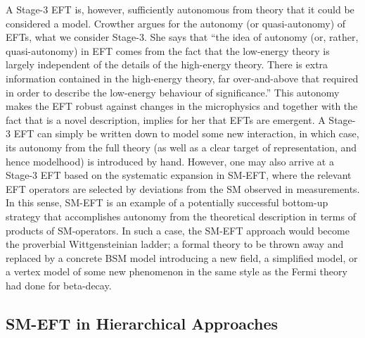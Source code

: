 A Stage-3 EFT is, however, sufficiently autonomous from theory that it could be considered a model. 
Crowther \citep{Crowther2016-CROESU} argues for the autonomy (or quasi-autonomy) of EFTs, what we consider Stage-3.
She says that ``the idea of autonomy (or, rather, quasi-autonomy) in EFT comes from the fact that the low-energy theory is largely independent of the details of the high-energy theory. There is extra information contained in the high-energy theory, far over-and-above that required in order to describe the low-energy behaviour of significance.'' 
This autonomy makes the EFT robust against changes in the microphysics and together with the fact that is a novel description, implies for her that EFTs are emergent.  
A Stage-3 EFT can simply be written down to model some new interaction, in which case, its autonomy from the full theory (as well as a clear target of representation, and hence modelhood) is introduced by hand. 
However, one may also arrive at a Stage-3 EFT based on the systematic expansion in SM-EFT, where the relevant EFT operators are selected by deviations from the SM observed in measurements. 
In this sense, SM-EFT is an example of a potentially successful bottom-up strategy that accomplishes autonomy from the theoretical description in terms of products of SM-operators. 
In such a case, the SM-EFT approach would become the proverbial Wittgensteinian ladder; a formal theory to be thrown away and replaced by a concrete BSM model introducing a new field, a simplified model, or a vertex model of some new phenomenon in the same style as the Fermi theory had done for beta-decay.


\subsection{SM-EFT in Hierarchical Approaches}
\label{sub:modelhood}

